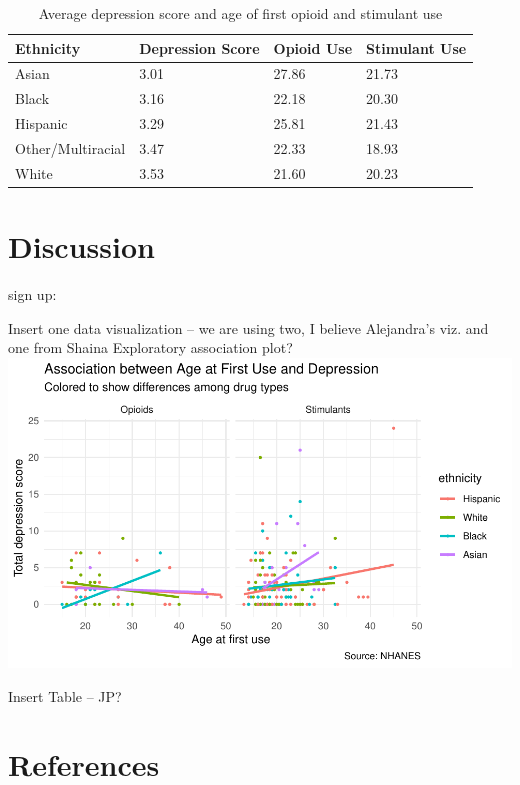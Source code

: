 \documentclass[man]{apa6}
\begin{document}
\begin{table}[tbp]
\begin{center}
\begin{threeparttable}
\caption{\label{tab:ST_table}Average depression score and age of first opioid and stimulant use}
\begin{tabular}{llll}
\toprule
Ethnicity & \multicolumn{1}{c}{Depression Score} & \multicolumn{1}{c}{Opioid Use} & \multicolumn{1}{c}{Stimulant Use}\\
\midrule
Asian & 3.01 & 27.86 & 21.73\\
Black & 3.16 & 22.18 & 20.30\\
Hispanic & 3.29 & 25.81 & 21.43\\
Other/Multiracial & 3.47 & 22.33 & 18.93\\
White & 3.53 & 21.60 & 20.23\\
\bottomrule
\end{tabular}
\end{threeparttable}
\end{center}
\end{table}

\section{Discussion}\label{discussion}

sign up:

Insert one data visualization -- we are using two, I believe Alejandra's
viz. and one from Shaina Exploratory association plot?
\includegraphics{Final_Paper_Group_3_files/figure-latex/ST_plot3-1.pdf}

Insert Table -- JP?

\newpage

\section{References}\label{references}
\end{document}
